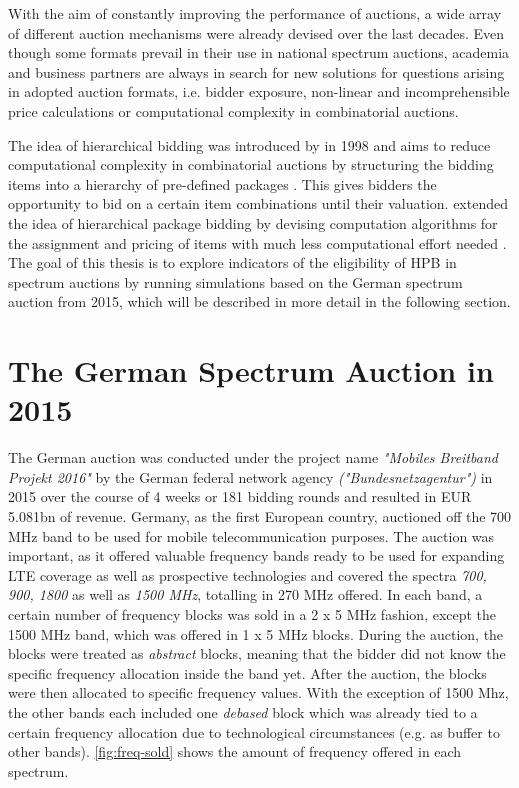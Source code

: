 With the aim of constantly improving the performance of auctions, a wide array of different auction mechanisms were already devised over the last decades. Even though some formats prevail in their use in national spectrum auctions, academia and business partners are always in search for new solutions for questions arising in adopted auction formats, i.e. bidder exposure, non-linear and incomprehensible price calculations or computational complexity in combinatorial auctions.

The idea of hierarchical bidding was introduced by \citeauthor{Rothkopf1998} in 1998 and aims to reduce computational complexity in combinatorial auctions by structuring the bidding items into a hierarchy of pre-defined packages \cite{Rothkopf1998}. This gives bidders the opportunity to bid on a certain item combinations until their valuation. 
\citeauthor{Goeree2010} extended the idea of hierarchical package bidding by devising computation algorithms for the assignment and pricing of items with much less computational effort needed \cite{Goeree2010}. The goal of this thesis is to explore indicators of the eligibility of HPB in spectrum auctions by running simulations based on the German spectrum auction from 2015, which will be described in more detail in the following section. 

\section{The German Spectrum Auction in 2015}\label{sec:MBP16}
The German auction was conducted under the project name \textit{"Mobiles Breitband Projekt 2016"} by the German federal network agency \textit{("Bundesnetzagentur")} in 2015 over the course of 4 weeks or 181 bidding rounds and resulted in EUR 5.081bn of revenue. Germany, as the first European country, auctioned off the 700 MHz band to be used for mobile telecommunication purposes. The auction was important, as it offered valuable frequency bands ready to be used for expanding LTE coverage as well as prospective technologies and covered the spectra \textit{700, 900, 1800} as well as \textit{1500 MHz}, totalling in 270 MHz offered. In each band, a certain number of frequency blocks was sold in a 2 x 5 MHz fashion, except the 1500 MHz band, which was offered in 1 x 5 MHz blocks. During the auction, the blocks were treated as \textit{abstract} blocks, meaning that the bidder did not know the specific frequency allocation inside the band yet. After the auction, the blocks were then allocated to specific frequency values. With the exception of 1500 Mhz, the other bands each included one \textit{debased} block which was already tied to a certain frequency allocation due to technological circumstances (e.g. as buffer to other bands). \autoref{fig:freq-sold} shows the amount of frequency offered in each spectrum. 

